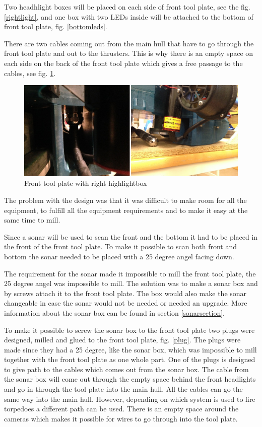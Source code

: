 Two headhlight boxes will be placed on each side of front tool plate, see the fig. \ref{rightlight}, and one box with two LEDs inside will be attached to the bottom of front tool plate, fig. \ref{bottomleds}.


There are two cables coming out from the main hull that have to go through the front tool plate and out to the thrusters. This is why there is an empty space on each side on the back of the front tool plate which gives a free passage to the cables, see fig. \ref{tcablespace}.

	\begin{figure}[!ht]
		\begin{center}
			\includegraphics[width=150mm]{./Images/Mechanics/tcablespace.jpg}
			\caption{Front tool plate with right highlightbox}
			\label{tcablespace}
		\end{center}
	\end{figure}

The problem with the design was that it was difficult to make room for all the equipment, to fulfill all the equipment requirements and to make it easy at the same time to mill.

Since a sonar will be used to scan the front and the bottom it had to be placed in the front of the front tool plate. To make it possible to scan both front and bottom the sonar needed to be placed with a 25 degree angel facing down. 

The requirement for the sonar made it impossible to mill the front tool plate, the 25 degree angel was impossible to mill. The solution was to make a sonar box and by screws attach it to the front tool plate.
The box would also make the sonar changeable in case the sonar would not be needed or needed an upgrade. More information about the sonar box can be found in section \ref{sonarsection}.

To make it possible to screw the sonar box to the front tool plate two plugs were designed, milled and glued to the front tool plate, fig. \ref{plug}. The plugs were made since they had a 25 degree, like the sonar box, which was impossible to mill together with the front tool plate as one whole part. One of the plugs is designed to give path to the cables which comes out from the sonar box. The cable from the sonar box will come out through the empty space behind the front headlights and go in through the tool plate into the main hull. All the cables can go the same way into the main hull. However, depending on which system is used to fire torpedoes a different path can be used. There is an empty space around the cameras which makes it possible for wires to go through into the tool plate.


